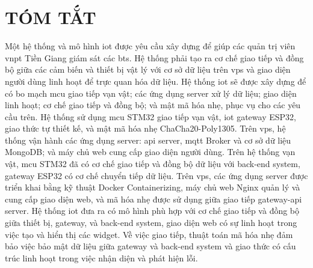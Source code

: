 \chapter*{TÓM TẮT}
\label{Abstract}

Một hệ thống và mô hình \acrfull{iot} được yêu cầu xây dựng để giúp các quản trị viên \acrfull{vnpt} Tiền Giang giám sát các \acrfull{bts}. Hệ thống phải tạo ra cơ chế giao tiếp và đồng bộ giữa các cảm biến và thiết bị vật lý với cơ sở dữ liệu trên \acrfull{vps} và giao diện người dùng linh hoạt để trực quan hóa dữ liệu. 
Hệ thống \acrshort{iot} sẽ được xây dựng để có bo mạch \acrfull{mcu} giao tiếp vạn vật; các ứng dụng server xử lý dữ liệu; giao diện linh hoạt; cơ chế giao tiếp và đồng bộ; và mật mã hóa nhẹ, phục vụ cho các yêu cầu trên.
Hệ thống sử dụng \acrshort{mcu} STM32 giao tiếp vạn vật, \acrshort{iot} gateway ESP32, giao thức tự thiết kế, và mật mã hóa nhẹ ChaCha20-Poly1305. Trên \acrshort{vps}, hệ thống vận hành các ứng dụng server: \acrfull{api} server, \acrfull{mqtt} Broker và cơ sở dữ liệu MongoDB; và máy chủ web cung cấp giao diện người dùng. 
Trên hệ thống vạn vật, \acrshort{mcu} STM32 đã có cơ chế giao tiếp và đồng bộ dữ liệu với back-end system, gateway ESP32 có cơ chế chuyển tiếp dữ liệu. Trên \acrshort{vps}, các ứng dụng server được triển khai bằng kỹ thuật Docker Containerizing, máy chủ web Nginx quản lý và cung cấp giao diện web, và mã hóa nhẹ được sử dụng giữa giao tiếp gateway-\acrshort{api} server. 
Hệ thống \acrshort{iot} đưa ra có mô hình phù hợp với cơ chế giao tiếp và đồng bộ giữa thiết bị, gateway, và back-end system, giao diện web có sự linh hoạt trong việc tạo và hiển thị các widget. Về việc giao tiếp, thuật toán mã hóa nhẹ đảm bảo việc bảo mật dữ liệu giữa gateway và back-end system và giao thức có cấu trúc linh hoạt trong việc nhận diện và phát hiện lỗi.